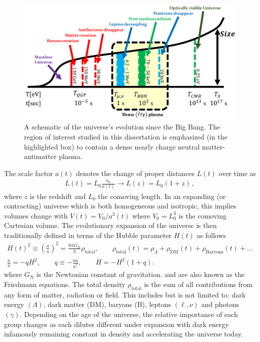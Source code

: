 \begin{figure}[ht]
 \centering
 \includegraphics[width=0.95\linewidth]{plots/chap01intro/thesis_universe.png}
 \caption{A schematic of the universe's evolution since the Big Bang. The region of interest studied in this dissertation is emphasized (in the highlighted box) to contain a dense nearly charge neutral matter-antimatter plasma.}
 \label{fig:cosmo} 
\end{figure}

The scale factor $a(t)$ denotes the change of proper distances $L(t)$ over time as
\begin{gather}
    L(t)=L_{0}\frac{a_{0}}{a(t)}\rightarrow L(z)=L_{0}(1+z)\,,
\end{gather}
where $z$ is the redshift and $L_{0}$ the comoving length. In an expanding (or contracting) universe which is both homogeneous and isotropic, this implies volumes change with $V(t)=V_{0}/a^{3}(t)$ where $V_{0}=L_{0}^{3}$ is the comoving Cartesian volume. The evolutionary expansion of the universe is then traditionally defined in terms of the Hubble parameter $H(t)$ as follows
\begin{gather}
  \label{Friedmann:1} H(t)^{2}\equiv\left(\frac{\dot a}{a}\right)^2=\frac{8\pi G_{N}}{3}\rho_\mathrm{total},\qquad \rho_\mathrm{total}(t)=\rho_{\Lambda}+\rho_\mathrm{DM}(t)+\rho_\mathrm{Baryons}(t)+\ldots\\
  \label{Friedmann:2}
  \frac{\ddot a}{a}=-qH^2,\qquad 
q\equiv -\frac{a\ddot a}{\dot a^2},\qquad \dot H=-H^2(1+q).
\end{gather}
where $G_N$ is the Newtonian constant of gravitation.  and  are also known as the Friedmann equations. The total density $\rho_\mathrm{total}$ is the sum of all contributions from any form of matter, radiation or field. This includes but is not limited to: dark energy $(\Lambda)$, dark matter (DM), baryons (B), leptons $(\ell,\nu)$ and photons $(\gamma)$. Depending on the age of the universe, the relative importance of each group changes as each dilutes different under expansion with dark energy infamously remaining constant in density and accelerating the universe today.

